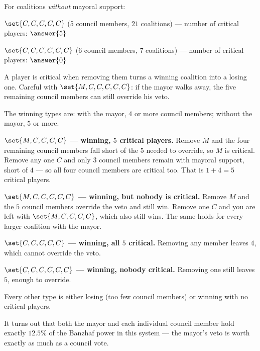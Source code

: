 \documentclass[12pt]{ximera}
\begin{document}
\begin{problem}
\begin{prompt}
\smallskip
For coalitions \emph{without} mayoral support:

$\set{C, C, C, C, C}$ (5 council members, $21$ coalitions) --- number of critical
players: $\answer{5}$

\smallskip
$\set{C,C,C,C,C,C}$ (6 council members, $7$ coalitions) --- number of critical
players: $\answer{0}$

\begin{hint}
A player is critical when removing them turns a winning coalition into a losing one.
Careful with $\set{M,C,C,C,C,C}$: if the mayor walks away, the five remaining council
members can still override his veto.
\end{hint}

\begin{feedback}
The winning types are: with the mayor, $4$ or more council members; without the mayor,
$5$ or more.

\textbf{$\set{M,C,C,C,C}$ --- winning, $5$ critical players.} Remove $M$ and the four
remaining council members fall short of the $5$ needed to override, so $M$ is
critical. Remove any one $C$ and only $3$ council members remain with mayoral support,
short of $4$ --- so all four council members are critical too. That is $1+4 = 5$
critical players.

\textbf{$\set{M,C,C,C,C,C}$ --- winning, but nobody is critical.} Remove $M$ and the
$5$ council members override the veto and still win. Remove one $C$ and you are left
with $\set{M,C,C,C,C}$, which also still wins. The same holds for every larger
coalition with the mayor.

\textbf{$\set{C,C,C,C,C}$ --- winning, all $5$ critical.} Removing any member leaves
$4$, which cannot override the veto.

\textbf{$\set{C,C,C,C,C,C}$ --- winning, nobody critical.} Removing one still leaves
$5$, enough to override.

Every other type is either losing (too few council members) or winning with no
critical players.
\end{feedback}
\end{prompt}

It turns out that both the mayor and each individual council member hold exactly
$12.5\%$ of the Banzhaf power in this system --- the mayor's veto is worth exactly as much
as a council vote.
\end{problem}
\end{document}
